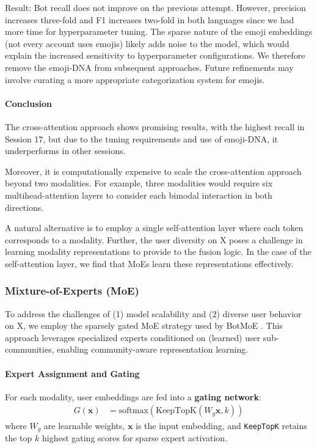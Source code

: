 \documentclass[conference]{IEEEtran}
\begin{document}
Result: Bot recall does not improve on the previous attempt. 
However, precision increases three-fold and F1 increases two-fold 
in both languages since we had more time for hyperparameter tuning.
The sparse nature of the emoji embeddings (not every account uses emojis)
likely adds noise to the model, 
which would explain the increased 
sensitivity to hyperparameter configurations. 
We therefore remove the emoji-DNA from subsequent
approaches. Future refinements may involve curating
a more appropriate categorization system for emojis. 

\paragraph{Conclusion}
The cross-attention approach shows promising results,
with the highest recall in Session 17, but due to the
tuning requirements and use of emoji-DNA,
it underperforms in other sessions. 

Moreover, it
is computationally expensive to scale the cross-attention approach
beyond two modalities. For example, three modalities would 
require six multihead-attention layers to consider 
each bimodal interaction in both directions.

A natural alternative is to employ a single self-attention 
layer where each token corresponds to a modality. Further,
the user diversity on X poses a challenge in learning modality 
representations to provide to the fusion logic. 
In the case of the self-attention layer,
we find that MoEs learn these representations effectively.


\subsubsection{\textbf{Mixture-of-Experts (MoE)}}
To address the challenges of (1) model scalability and 
(2) diverse user behavior on X, we employ the sparsely gated 
MoE \citep{shazeer2017outrageously} 
strategy used by BotMoE \citep{liu2023botmoe}. This approach leverages specialized 
experts conditioned on (learned) user sub-communities, enabling community-aware representation learning.

\paragraph{Expert Assignment and Gating}
For each modality, user embeddings are fed into a \textbf{gating network}:
\begin{align} \label{eq:moe-gating}
G(\mathbf{x}) &= \text{softmax}(\text{KeepTopK}(W_g \mathbf{x}, k))
\end{align}
where \( W_g \) are learnable weights, 
\( \mathbf{x} \) is the input embedding, 
and \texttt{KeepTopK} retains the top \( k \) highest gating scores 
for sparse expert activation.
\end{document}
